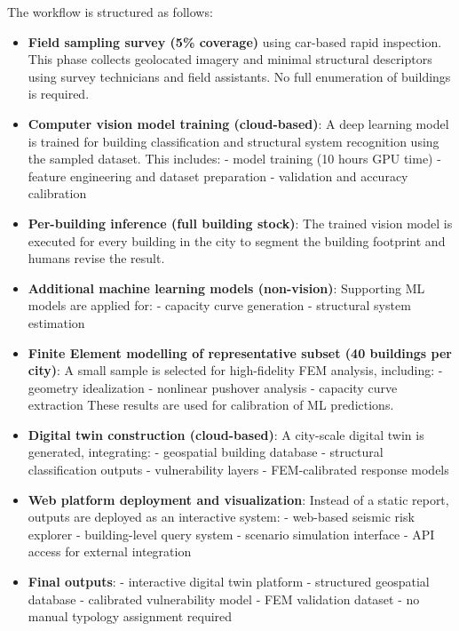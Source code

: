 The workflow is structured as follows:

\begin{itemize}

\item \textbf{Field sampling survey (5\% coverage)} using car-based rapid inspection.
This phase collects geolocated imagery and minimal structural descriptors using survey technicians and field assistants.
No full enumeration of buildings is required.

\item \textbf{Computer vision model training (cloud-based)}:
A deep learning model is trained for building classification and structural system recognition using the sampled dataset.
This includes:
- model training (10 hours GPU time)
- feature engineering and dataset preparation
- validation and accuracy calibration

\item \textbf{Per-building inference (full building stock)}:
The trained vision model is executed for every building in the city to segment the building footprint and humans revise the result.

\item \textbf{Additional machine learning models (non-vision)}:
Supporting ML models are applied for:
- capacity curve generation
- structural system estimation

\item \textbf{Finite Element modelling of representative subset (40 buildings per city)}:
A small sample is selected for high-fidelity FEM analysis, including:
- geometry idealization
- nonlinear pushover analysis
- capacity curve extraction
These results are used for calibration of ML predictions.

\item \textbf{Digital twin construction (cloud-based)}:
A city-scale digital twin is generated, integrating:
- geospatial building database
- structural classification outputs
- vulnerability layers
- FEM-calibrated response models

\item \textbf{Web platform deployment and visualization}:
Instead of a static report, outputs are deployed as an interactive system:
- web-based seismic risk explorer
- building-level query system
- scenario simulation interface
- API access for external integration

\item \textbf{Final outputs}:
- interactive digital twin platform  
- structured geospatial database  
- calibrated vulnerability model  
- FEM validation dataset  
- no manual typology assignment required

\end{itemize}


